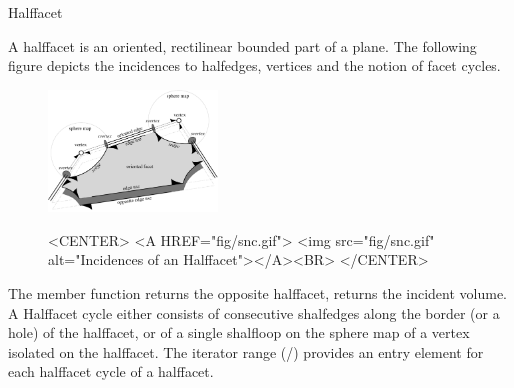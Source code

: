 
\ccRefPageBegin



\begin{ccRefClass}{Halffacet}

\ccDefinition

A halffacet is an oriented, rectilinear bounded part of a plane. The following
figure depicts the incidences to halfedges, vertices and the notion of facet
cycles.

    \begin{figure}[bht]
\begin{ccTexOnly}
        \begin{center}
          \parbox{0.4\textwidth}{%
              \includegraphics[width=0.4\textwidth]{Nef_3_ref/fig/snc}%
          }
        \end{center}
\end{ccTexOnly}

\begin{ccHtmlOnly}
    <CENTER>
    <A HREF="fig/snc.gif">
        <img src="fig/snc.gif" 
             alt="Incidences of an Halffacet"></A><BR>
    </CENTER>
\end{ccHtmlOnly}
        \label{figureNef3FacetIncidences}
    \end{figure}

The member function  returns the opposite halffacet, 
returns the incident volume. A Halffacet cycle either consists of consecutive
shalfedges along the border (or a hole) of the halffacet, or of a single
shalfloop on the sphere map of a vertex isolated on the halffacet. The 
iterator range (/)
provides an entry element for each halffacet cycle of a halffacet.


\end{ccRefClass}
